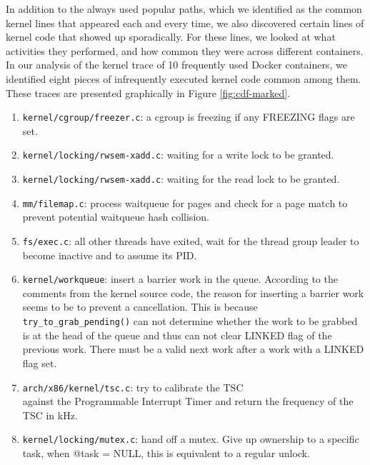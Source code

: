 In addition to the always used popular paths, which we identified as the common kernel lines that appeared each and every time, 
we also discovered certain lines of kernel code that showed up sporadically. 
For these lines, we looked at what activities they performed, and how common they were across different containers. 
In our analysis of the kernel trace of 10 frequently used Docker containers, we identified eight pieces of infrequently executed kernel code common among them. 
These traces are presented graphically in Figure \ref{fig:cdf-marked}. 
\begin{enumerate}
	\item \verb|kernel/cgroup/freezer.c|: a cgroup is freezing if any FREEZING flags are set.
	\item \verb|kernel/locking/rwsem-xadd.c|: waiting for a write lock to be granted. 
	\item \verb|kernel/locking/rwsem-xadd.c|: waiting for the read lock to be granted.
	\item \verb|mm/filemap.c|: process waitqueue for pages and check for a page match to prevent potential waitqueue hash collision. 
	\item \verb|fs/exec.c|: all other threads have exited, wait for the thread group leader to become inactive and to assume its PID. 
	\item \verb|kernel/workqueue|: insert a barrier work in the queue. According to the comments from the kernel source code, 
	the reason for inserting a barrier work seems to be to prevent a cancellation. 
	This is because \\
	\verb|try_to_grab_pending()| can not determine whether the work to be grabbed is at the head of the queue and thus can not clear LINKED flag of the previous work. 
	There must be a valid next work after a work with a LINKED flag set. 
	\item \verb|arch/x86/kernel/tsc.c|: try to calibrate the TSC \\ 
	against the Programmable Interrupt Timer and return the frequency of the TSC in kHz. 
	\item \verb|kernel/locking/mutex.c|: hand off a mutex. Give up ownership to a specific task, when @task = NULL, this is equivalent to a regular unlock.
\end{enumerate}

